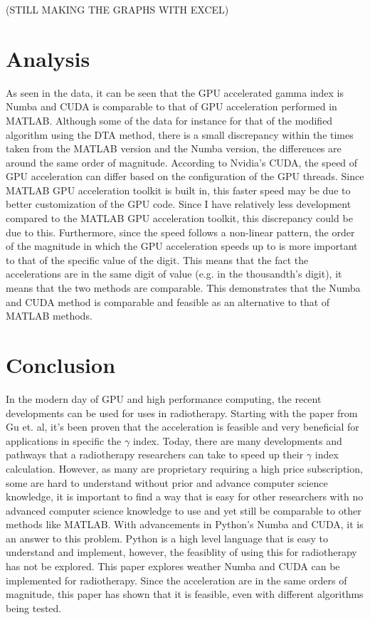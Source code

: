 \documentclass[12pt]{article}
\begin{document}
(STILL MAKING THE GRAPHS WITH EXCEL)

\section{Analysis}
As seen in the data, it can be seen that the GPU accelerated gamma index is Numba and CUDA is comparable to that of GPU acceleration performed in MATLAB. Although some of the data for instance for that of the modified algorithm using the DTA method, there is a small discrepancy within the times taken from the MATLAB version and the Numba version, the differences are around the same order of magnitude. According to Nvidia's CUDA, the speed of GPU acceleration can differ based on the configuration of the GPU threads. Since MATLAB GPU acceleration toolkit is built in, this faster speed may be due to better customization of the GPU code. Since I have relatively less development compared to the MATLAB GPU acceleration toolkit, this discrepancy could be due to this. Furthermore, since the speed follows a non-linear pattern, the order of the magnitude in which the GPU acceleration speeds up to is more important to that of the specific value of the digit. This means that the fact the accelerations are in the same digit of value (e.g. in the thousandth's digit), it means that the two methods are comparable. This demonstrates that the Numba and CUDA method is comparable and feasible as an alternative to that of MATLAB methods.

\section{Conclusion}
In the modern day of GPU and high performance computing, the recent developments can be used for uses in radiotherapy. Starting with the paper from Gu et. al, it's been proven that the acceleration is feasible and very beneficial for applications in specific the $\gamma$ index. Today, there are many developments and pathways that a radiotherapy researchers can take to speed up their $\gamma$ index calculation. However, as many are proprietary requiring a high price subscription, some are hard to understand without prior and advance computer science knowledge, it is important to find a way that is easy for other researchers with no advanced computer science knowledge to use and yet still be comparable to other methods like MATLAB. With advancements in Python's Numba and CUDA, it is an answer to this problem. Python is a high level language that is easy to understand and implement, however, the feasiblity of using this for radiotherapy has not be explored. This paper explores weather Numba and CUDA can be implemented for radiotherapy. Since the acceleration are in the same orders of magnitude, this paper has shown that it is feasible, even with different algorithms being tested.
\end{document}
